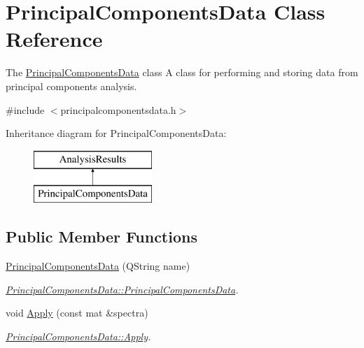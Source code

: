 \hypertarget{class_principal_components_data}{}\section{Principal\+Components\+Data Class Reference}
\label{class_principal_components_data}


The \hyperlink{class_principal_components_data}{Principal\+Components\+Data} class A class for performing and storing data from principal components analysis.  




{\ttfamily \#include $<$principalcomponentsdata.\+h$>$}

Inheritance diagram for Principal\+Components\+Data\+:\begin{figure}[H]
\begin{center}
\leavevmode
\includegraphics[height=2.000000cm]{class_principal_components_data}
\end{center}
\end{figure}
\subsection*{Public Member Functions}
\begin{DoxyCompactItemize}
\item 
\hyperlink{class_principal_components_data_a56e200f784e21869a26cafe8d6a00b31}{Principal\+Components\+Data} (Q\+String name)
\begin{DoxyCompactList}\small\item\em \hyperlink{class_principal_components_data_a56e200f784e21869a26cafe8d6a00b31}{Principal\+Components\+Data\+::\+Principal\+Components\+Data}. \end{DoxyCompactList}\item 
void \hyperlink{class_principal_components_data_a8aa4931e64c621123288098323513e0a}{Apply} (const mat \&spectra)
\begin{DoxyCompactList}\small\item\em \hyperlink{class_principal_components_data_a8aa4931e64c621123288098323513e0a}{Principal\+Components\+Data\+::\+Apply}. \end{DoxyCompactList}\end{DoxyCompactItemize}


